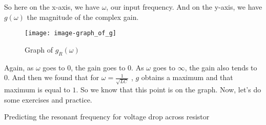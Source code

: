 So here on the x-axis, we have $\omega$, our input frequency.
And on the y-axis, we have $g (\omega)$ the magnitude
of the complex gain.

\begin{figure}[ht!]
  \centering
  \texttt{[image: image-graph\_of\_g]}
  \caption{Graph of $g _R (\omega)$}
\end{figure}

Again, as $\omega$ goes to $0$, the gain goes to $0$.
As $\omega$ goes to $\infty$, the gain also tends to $0$.
And then we found that for $\omega  =  \frac{1}{\sqrt{LC}}$
, $g$ obtains a maximum and that maximum is equal to $1$.
So we know that this point is on the graph.
Now, let's do some exercises and practice.

\begin{exercise}
  Predicting the resonant frequency for voltage drop across resistor
\end{exercise}

